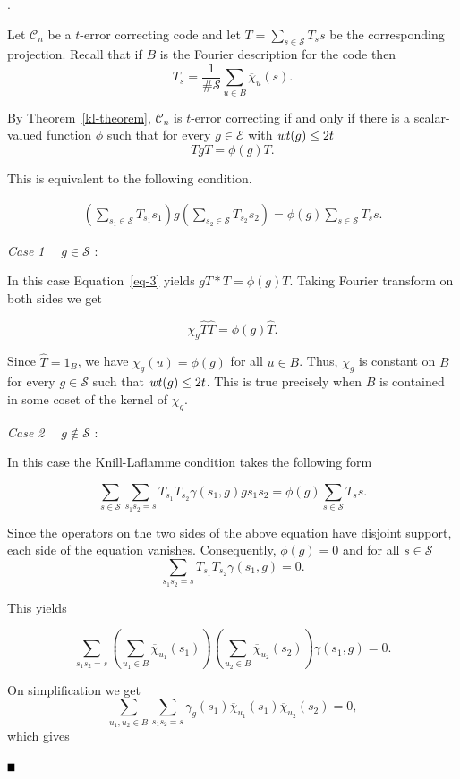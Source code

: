 \documentclass{Rinton-P9x6}
\newcommand{\bproof}{\noindent{\it Proof}}
\newcommand{\eproof}{\hspace*{\fill}$\rule{2mm}{2mm}$~~~~~\bigskip}
\renewenvironment{proof}{\bproof. }{\eproof}
\newcommand{\wt}{{\it wt}}
\newcommand{\C}{{\ensuremath{\mathcal{C}}}}
\renewcommand{\S}{{\ensuremath{\mathcal{S}}}}
\newcommand{\E}{{\ensuremath{\mathcal{E}}}}
\begin{document}
\begin{proof}
  
  Let $\C_n$ be a $t$-error correcting code and let $T = \sum_{s\in\S}
  T_s s$ be the corresponding projection. Recall that if $B$ is the
  Fourier description for the code then
\[
T_s = \frac{1}{\# \S} \sum_{u \in B} \overline{\chi}_u(s).
\]
  
By Theorem~\ref{kl-theorem}, $\C_n$ is $t$-error correcting if and
only if there is a scalar-valued function $\phi$ such that for every
$g\in\E$ with $\wt(g)\leq 2t$
\[
TgT = \phi(g) T.
\]

This is equivalent to the following condition.

\begin{eqnarray}\label{eq-3}
\left( \sum_{s_1 \in \S} T_{s_1} s_1 \right) g 
\left( \sum_{s_2 \in \S} T_{s_2} s_2 \right) = \phi(g)\sum_{s\in\S}T_s s.
\end{eqnarray}

{{\em Case 1}~~ $g \in \S$ :}

In this case Equation~\ref{eq-3} yields $gT*T =\phi(g)T$. Taking Fourier
transform on both sides we get 

\[ \chi_g \hat{T} \hat{T} = \phi(g)\hat{T}.\] 

Since $\hat{T} = 1_B$, we have $\chi_g(u) = \phi(g)$ for all $u \in
B$.  Thus, $\chi_g$ is constant on $B$ for every $g \in \S$ such that
$\wt(g)\leq 2t$. This is true precisely when $B$ is contained in some
coset of the kernel of $\chi_g$.

{{\em Case 2}~~ $g\not\in\S$ :}

In this case the Knill-Laflamme condition takes the following form

\[
\sum_{s\in\S}
\sum_{s_1s_2 = s} T_{s_1}T_{s_2} \gamma(s_1,g) g s_1 s_2 = \phi(g)
\sum_{s \in \S} T_s s.
\]

Since the operators on the two sides of the above equation have
disjoint support, each side of the equation vanishes. Consequently,
$\phi(g) = 0$ and for all $s \in \S$
\[
\sum_{s_1s_2 =s} T_{s_1} T_{s_2} \gamma(s_1,g) = 0.
\] 

This yields

\[
\sum_{s_1s_2 =s} \left(\sum_{u_1 \in B}\overline{\chi}_{u_1}(s_1)
\right) \left(\sum_{u_2 \in B}{\overline{\chi}_{u_2}}(s_2)\right)
\gamma(s_1,g) = 0.
\]

On simplification we get
\[
\sum_{u_1,u_2 \in B} \sum_{s_1 s_2 = s } \gamma_g(s_1)
\overline{\chi}_{u_1}(s_1) \overline{\chi}_{u_2}(s_2) = 0,
\]
which gives 


\end{proof}
\end{document}
